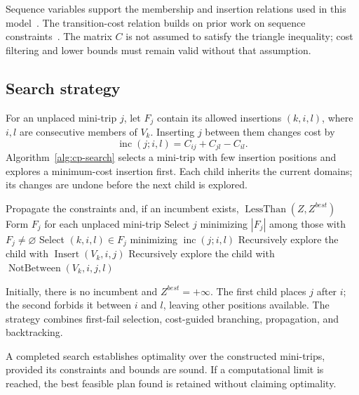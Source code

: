 Sequence variables support the membership and insertion relations used in
this model~\cite{delecluse2025sequence}. The transition-cost relation builds
on prior work on sequence constraints~\cite{minicpTransitionCost}. The matrix
$C$ is not assumed to satisfy the triangle inequality; cost filtering and
lower bounds must remain valid without that assumption.

\subsection{Search strategy}
For an unplaced mini-trip $j$, let $F_j$ contain its allowed insertions
$(k,i,l)$, where $i,l$ are consecutive members of $V_k$. Inserting $j$ between
them changes cost by
\[
\operatorname{inc}(j;i,l)=C_{ij}+C_{jl}-C_{il}.
\]
Algorithm~\ref{alg:cp-search} selects a mini-trip with few insertion positions
and explores a minimum-cost insertion first. Each child inherits the current
domains; its changes are undone before the next child is explored.

\begin{algorithm}[htbp]
\SetAlgoLined
{}
Propagate the constraints and, if an incumbent exists, $\operatorname{LessThan}(Z,Z^{best})$\;
Form $F_j$ for each unplaced mini-trip\;
Select $j$ minimizing $|F_j|$ among those with $F_j\neq\varnothing$\;
Select $(k,i,l)\in F_j$ minimizing $\operatorname{inc}(j;i,l)$\;
Recursively explore the child with $\operatorname{Insert}(V_k,i,j)$\;
Recursively explore the child with $\operatorname{NotBetween}(V_k,i,j,l)$\;
\caption{Depth-first insertion search with objective improvement}\label{alg:cp-search}
\end{algorithm}

Initially, there is no incumbent and $Z^{best}=+\infty$. The first child places
$j$ after $i$; the second forbids it between $i$ and $l$, leaving other positions
available. The strategy combines first-fail selection, cost-guided branching,
propagation, and backtracking.

A completed search establishes optimality over the constructed mini-trips,
provided its constraints and bounds are sound. If a computational limit is
reached, the best feasible plan found is retained without claiming optimality.

